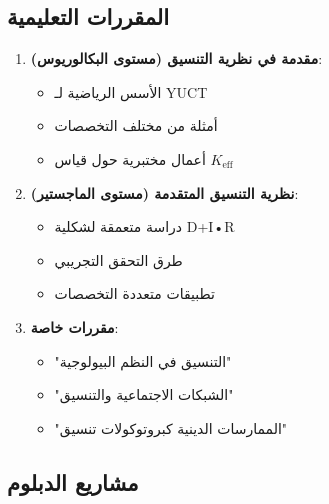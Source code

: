 \documentclass[12pt,a4paper]{article}
\begin{document}
	\subsection{المقررات التعليمية}
	
	\begin{enumerate}
		\item \textbf{مقدمة في نظرية التنسيق (مستوى البكالوريوس)}:
		\begin{itemize}
			\item الأسس الرياضية لـ YUCT
			\item أمثلة من مختلف التخصصات
			\item أعمال مختبرية حول قياس $K_{\mathrm{eff}}$
		\end{itemize}
		
		\item \textbf{نظرية التنسيق المتقدمة (مستوى الماجستير)}:
		\begin{itemize}
			\item دراسة متعمقة لشكلية D+I•R
			\item طرق التحقق التجريبي
			\item تطبيقات متعددة التخصصات
		\end{itemize}
		
		\item \textbf{مقررات خاصة}:
		\begin{itemize}
			\item "التنسيق في النظم البيولوجية"
			\item "الشبكات الاجتماعية والتنسيق"
			\item "الممارسات الدينية كبروتوكولات تنسيق"
		\end{itemize}
	\end{enumerate}
	
	\subsection{مشاريع الدبلوم}
	
\end{document}
